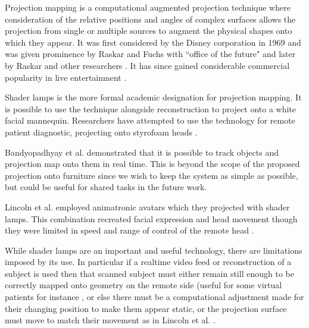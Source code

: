 Projection mapping is a computational augmented projection technique where consideration of the relative positions and angles of complex surfaces allows the projection from single or multiple sources to augment the physical shapes onto which they appear. It was first considered by the Disney corporation in 1969 \cite{projectionmappingweb2013} and was given prominence by Raskar and Fuchs with ``office of the future" \cite{Raskar1998} and later by Raskar and other researchers \cite{Low2001, Raskar2001a}. It has since gained considerable commercial popularity in live entertainment \cite{googleStatsProjectionMapping}.\par
                    Shader lamps \cite{Raskar2001a} is the more formal academic designation for projection mapping. It is possible to use the technique alongside reconstruction to project onto a white facial mannequin. Researchers have attempted to use the technology for remote patient diagnostic, projecting onto styrofoam heads  \cite{Rivera-Gutierrez2012}.\par          
                     Bandyopadhyay et al. demonstrated \cite{Bandyopadhyay} that it is possible to track objects and projection map \cite{Dalsgaard2011} onto them in real time. This is beyond the scope of the proposed projection onto furniture since we wish to keep the system as simple as possible, but could be useful for shared tasks in the future work.\par
                    Lincoln et al. employed animatronic avatars which they projected with shader lamps. This combination recreated facial expression and head movement though they were limited in speed and range of control of the remote head \cite{Lincoln:2010it}.\par
                    While shader lamps are an important and useful technology, there are limitations imposed by its use. In particular if a realtime video feed or reconstruction of a subject is used then that scanned subject must either remain still enough to be correctly mapped onto geometry on the remote side (useful for some virtual patients for instance \cite{Benjamin2012}, or else there must be a computational adjustment made for their changing position to make them appear static, or the projection surface must move to match their movement as in Lincoln et al. .
   
